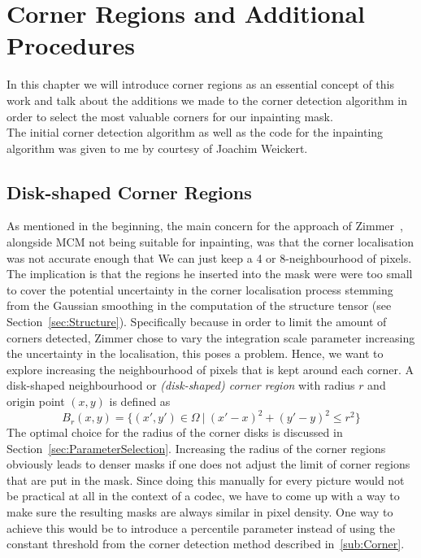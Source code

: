 \chapter{Corner Regions and Additional Procedures}\label{ch:Modelling}
In this chapter we will introduce corner regions as an essential concept of this work and talk
about the additions we made to the corner detection algorithm in order to select the most valuable
corners for our inpainting mask.\\
The initial corner detection algorithm as well as the code for the inpainting algorithm was given
to me by courtesy of Joachim Weickert.

\section{Disk-shaped Corner Regions}
As mentioned in the beginning, the main concern for the approach of Zimmer~\cite{zimmer07}, alongside 
MCM not being suitable for inpainting, was that the corner localisation was not accurate enough that 
We can just keep a 4 or 8-neighbourhood of pixels.
The implication is that the regions he inserted into the mask were were too small to
cover the potential uncertainty in the corner localisation process stemming from the Gaussian
smoothing in the computation of the structure tensor (see Section~\ref{sec:Structure}). Specifically
because in order to limit the amount of corners detected, Zimmer chose to vary the integration scale
parameter increasing the uncertainty in the localisation, this poses a problem.
Hence, we want to explore increasing the neighbourhood of pixels that is kept around each
corner. A disk-shaped neighbourhood or \textit{(disk-shaped) corner region} with radius $r$ and origin point $(x, y)$ is defined as 
\begin{equation}
    B_r(x, y) = \lbrace (x',y') \in \Omega\ \vert\ {(x'-x)}^2 + {(y'-y)}^2 \leq r^2\rbrace
\end{equation}
The optimal choice for the radius of the corner disks is discussed in
Section~\ref{sec:ParameterSelection}.
Increasing the radius of the corner regions obviously leads to denser masks if one does not adjust
the limit of corner regions that are put in the mask. Since doing this manually for every picture
would not be practical at all in the context of a codec, we have to come up with a way to make sure
the resulting masks are always similar in pixel density.\newpage\noindent
One way to achieve this would be to introduce a percentile parameter instead of using the constant
threshold from the corner detection method described in~\ref{sub:Corner}.

